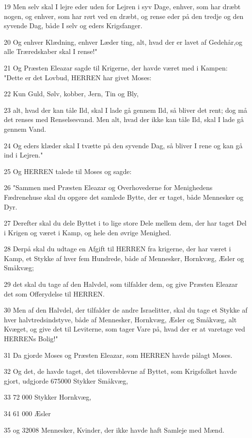 \par 19 Men selv skal I lejre eder uden for Lejren i syv Dage, enhver, som har dræbt nogen, og enhver, som har rørt ved en dræbt, og rense eder på den tredje og den syvende Dag, både I selv og eders Krigsfanger.
\par 20 Og enhver Klædning, enhver Læder ting, alt, hvad der er lavet af Gedehår,og alle Træredskaber skal I rense!"
\par 21 Og Præsten Eleazar sagde til Krigerne, der havde været med i Kampen: "Dette er det Lovbud, HERREN har givet Moses:
\par 22 Kun Guld, Sølv, kobber, Jern, Tin og Bly,
\par 23 alt, hvad der kan tåle Ild, skal I lade gå gennem Ild, så bliver det rent; dog må det renses med Renselsesvand. Men alt, hvad der ikke kan tåle Ild, skal I lade gå gennem Vand.
\par 24 Og eders klæder skal I tvætte på den syvende Dag, så bliver I rene og kan gå ind i Lejren."
\par 25 Og HERREN talede til Moses og sagde:
\par 26 "Sammen med Præsten Eleazar og Overhovederne for Menighedens Fædrenehuse skal du opgøre det samlede Bytte, der er taget, både Mennesker og Dyr.
\par 27 Derefter skal du dele Byttet i to lige store Dele mellem dem, der har taget Del i Krigen og været i Kamp, og hele den øvrige Menighed.
\par 28 Derpå skal du udtage en Afgift til HERREN fra krigerne, der har været i Kamp, et Stykke af hver fem Hundrede, både af Mennesker, Hornkvæg, Æsler og Småkvæg;
\par 29 det skal du tage af den Halvdel, som tilfalder dem, og give Præsten Eleazar det som Offerydelse til HERREN.
\par 30 Men af den Halvdel, der tilfalder de andre Israelitter, skal du tage et Stykke af hver halvtredsindstyve, både af Mennesker, Hornkvæg, Æsler og Småkvæg, alt Kvæget, og give det til Leviterne, som tager Vare på, hvad der er at varetage ved HERRENs Bolig!"
\par 31 Da gjorde Moses og Præsten Eleazar, som HERREN havde pålagt Moses.
\par 32 Og det, de havde taget, det tiloversblevne af Byttet, som Krigsfolket havde gjort, udgjorde 675000 Stykker Småkvæg,
\par 33 72 000 Stykker Hornkvæg,
\par 34 61 000 Æsler
\par 35 og 32008 Mennesker, Kvinder, der ikke havde haft Samleje med Mænd.

